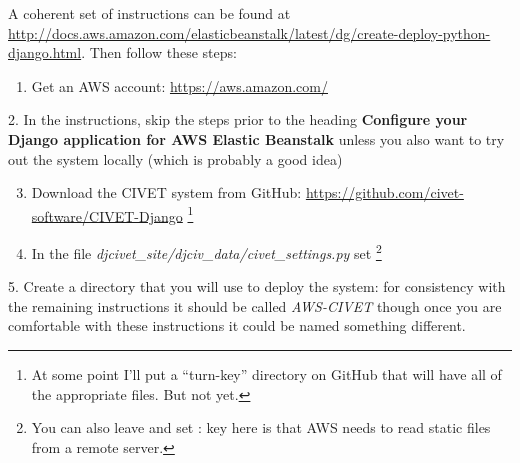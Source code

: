 \documentclass[letterpaper,10pt,english]{sphinxmanual}
\begin{document}
A coherent set of instructions can be found at
\href{http://docs.aws.amazon.com/elasticbeanstalk/latest/dg/create-deploy-python-django.html}{http://docs.aws.amazon.com/elasticbeanstalk/latest/dg/create-deploy-python-django.html}. Then follow these steps:
\begin{enumerate}
\item {} 
Get an AWS account: \href{https://aws.amazon.com/}{https://aws.amazon.com/}

\end{enumerate}

2. In the instructions, skip the steps prior to the
heading \textbf{Configure your Django application for AWS Elastic Beanstalk} unless you also want to try out the system
locally (which is probably a good idea)
\begin{enumerate}
\setcounter{enumi}{2}
\item {} 
Download the CIVET system from GitHub: \href{https://github.com/civet-software/CIVET-Django}{https://github.com/civet-software/CIVET-Django} \footnote{
At some point I'll put a “turn-key” directory on GitHub that will have all of the appropriate files. But not yet.
}

\item {} 
In the file \emph{djcivet\_site/djciv\_data/civet\_settings.py} set  \footnote{
You can also leave  and set :
key here is that AWS needs to read static files from a remote server.
}

\end{enumerate}

5. Create a directory that you will use to deploy the system: for consistency with the remaining instructions it should be
called \emph{AWS-CIVET} though once you are comfortable with these instructions it could be named something different.
\end{document}
